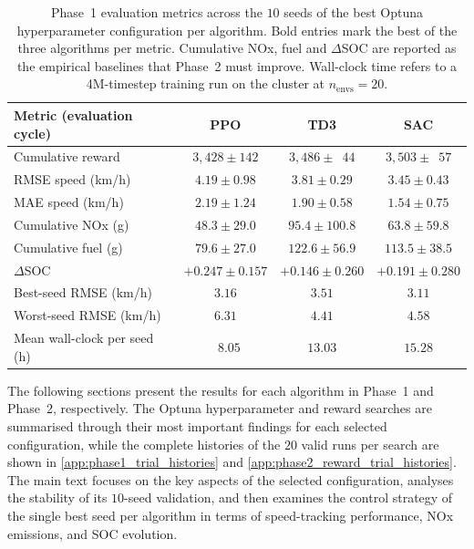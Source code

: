 \begin{table}[H]
  \centering
  \small
  \begin{tabular}{lccc}
    \hline
    \textbf{Metric (evaluation cycle)} & \textbf{PPO} & \textbf{TD3} & \textbf{SAC} \\
    \hline
    Cumulative reward                   & $3{,}428 \pm 142$ & $3{,}486 \pm \phantom{0}44$ & $3{,}503 \pm \phantom{0}57$ \\
    \ac{RMSE} speed (km/h)              & $4.19 \pm 0.98$   & $3.81 \pm 0.29$             & $\mathbf{3.45 \pm 0.43}$ \\
    \ac{MAE} speed (km/h)               & $2.19 \pm 1.24$   & $1.90 \pm 0.58$             & $\mathbf{1.54 \pm 0.75}$ \\
    Cumulative \ac{NOx} (g)             & $\mathbf{48.3 \pm 29.0}$ & $95.4 \pm 100.8$      & $63.8 \pm 59.8$ \\
    Cumulative fuel (g)                 & $\mathbf{79.6 \pm 27.0}$ & $122.6 \pm 56.9$      & $113.5 \pm 38.5$ \\
    $\Delta$\ac{SOC}                    & $+0.247 \pm 0.157$ & $+0.146 \pm 0.260$    & $+0.191 \pm 0.280$ \\
    Best-seed \ac{RMSE} (km/h)          & $3.16$            & $3.51$                      & $3.11$ \\
    Worst-seed \ac{RMSE} (km/h)         & $6.31$            & $4.41$                      & $4.58$ \\
    Mean wall-clock per seed (h)        & $\mathbf{\phantom{0}8.05}$ & $13.03$            & $15.28$ \\
    \hline
  \end{tabular}
  \caption[Phase~1 evaluation summary]{Phase~1 evaluation metrics across the $10$ seeds of the best Optuna hyperparameter configuration per algorithm. Bold entries mark the best of the three algorithms per metric. Cumulative \ac{NOx}, fuel and $\Delta$\ac{SOC} are reported as the empirical baselines that Phase~2 must improve. Wall-clock time refers to a 4M-timestep training run on the cluster at $n_{\text{envs}} = 20$.}
  \label{tab:phase1_summary}
\end{table}

The following sections present the results for each algorithm in Phase~1 and Phase~2, respectively. The Optuna hyperparameter and reward searches are summarised through their most important findings for each selected configuration, while the complete histories of the $20$ valid runs per search are shown in \autoref{app:phase1_trial_histories} and \autoref{app:phase2_reward_trial_histories}. The main text focuses on the key aspects of the selected configuration, analyses the stability of its $10$-seed validation, and then examines the control strategy of the single best seed per algorithm in terms of speed-tracking performance, \ac{NOx} emissions, and \ac{SOC} evolution.

